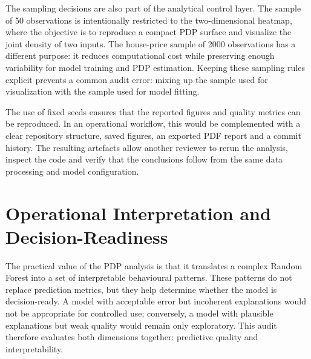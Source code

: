 \documentclass[
]{article}
\begin{document}
The sampling decisions are also part of the analytical control layer. The sample of 50 observations is intentionally restricted to the two-dimensional heatmap, where the objective is to reproduce a compact PDP surface and visualize the joint density of two inputs. The house-price sample of 2000 observations has a different purpose: it reduces computational cost while preserving enough variability for model training and PDP estimation. Keeping these sampling rules explicit prevents a common audit error: mixing up the sample used for visualization with the sample used for model fitting.

The use of fixed seeds ensures that the reported figures and quality metrics can be reproduced. In an operational workflow, this would be complemented with a clear repository structure, saved figures, an exported PDF report and a commit history. The resulting artefacts allow another reviewer to rerun the analysis, inspect the code and verify that the conclusions follow from the same data processing and model configuration.

\section{Operational Interpretation and Decision-Readiness}
\label{operational-interpretation-and-decision-readiness}

The practical value of the PDP analysis is that it translates a complex Random Forest into a set of interpretable behavioural patterns. These patterns do not replace prediction metrics, but they help determine whether the model is decision-ready. A model with acceptable error but incoherent explanations would not be appropriate for controlled use; conversely, a model with plausible explanations but weak quality would remain only exploratory. This audit therefore evaluates both dimensions together: predictive quality and interpretability.
\end{document}
